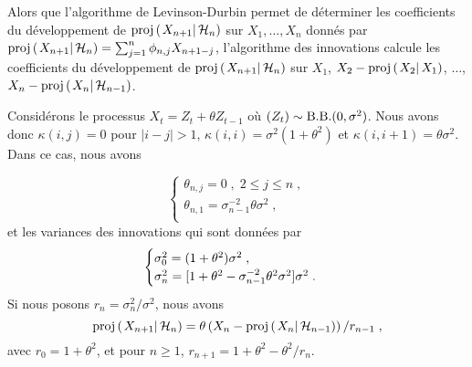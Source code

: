 Alors que l'algorithme de Levinson-Durbin permet de d\'eterminer
les coefficients du d\'eveloppement de $\proj{X_{n+1}}{\cH_n}$ sur
$X_1,\dots,X_n$ donn\'es par $\proj{X_{n+1}}{\cH_n}= \sum_{j=1}^n \phi_{n,j} X_{n+1-j}$,
l'algorithme des innovations calcule les coefficients du d\'eveloppement
de
$\proj{X_{n+1}}{\cH_n}$ sur $X_1$, $X_2 -
\proj{X_2}{X_1}$,
$\dots$, $X_{n} - \proj{X_n}{\cH_{n-1}}$.



\begin{example}
Consid\'erons le processus $X_t = Z_t + \theta Z_{t-1}$ o\`u $(Z_t) \sim \mathrm{B.B.}(0,\sigma^2)$. Nous avons donc $\kappa(i,j)= 0$ pour $|i-j| > 1$,
$\kappa(i,i)= \sigma^2(1+\theta^2)$ et $\kappa(i,i+1)= \theta
\sigma^2$. Dans ce cas, nous avons

$$
\begin{cases}
 \theta_{n,j}= 0\;,\; 2 \leq j \leq n \;, \\
 \theta_{n,1}= \sigma_{n-1}^{-2} \theta \sigma^2 \;,\\
\end{cases}
$$
et les variances des innovations qui sont donn\'ees par
$$
\begin{cases}
 \sigma_0^{2} = (1+\theta^2) \sigma^2 \;, \\
\sigma_{n}^{2}= [1 + \theta^2 - \sigma_{n-1}^{-2} \theta^2 \sigma^2] \sigma^2 \;.\\
\end{cases}
$$
Si nous posons $r_n = \sigma_n^2/\sigma^2$, nous avons
\[
\proj{X_{n+1}}{\cH_n}= \theta \left(X_n - \proj{X_n}{\cH_{n-1}}\right)/r_{n-1} \eqsp,
\]
avec $r_0=1+\theta^2$, et pour $n \geq 1$, $r_{n+1}= 1+\theta^2-\theta^2/r_n$.
\end{example}




